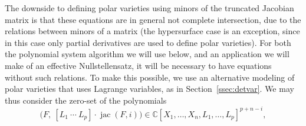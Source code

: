 \documentclass[12pt]{article}
\DeclareMathOperator{\jac}{jac}
\def\C{\mathbb{C}}
\newtheorem{ex}[theorem]{Example}
\begin{document}
The downside to defining polar varieties using minors of the truncated
Jacobian matrix is that these equations are in general not complete
intersection, due to the relations between minors of a matrix (the
hypersurface case is an exception, since in this case only partial
derivatives are used to define polar varieties). For both the
polynomial system algorithm we will use below, and an application we
will make of an effective Nullstellensatz, it will be necessary to
have equations without such relations. To make this possible, we use
an alternative modeling of polar varieties that uses Lagrange
variables, as in Section~\ref{ssec:detvar}. We may thus consider the zero-set of the polynomials
\[ \big(F,\ [L_1~\cdots~L_p]\cdot \jac(F, i)\big ) \in \C[X_1,\dots,X_n,L_1,\dots,L_p]^{p+n-i},\]
\end{document}
